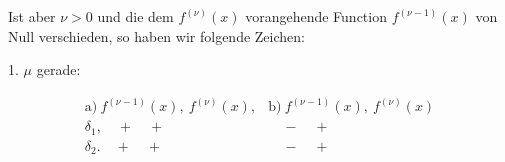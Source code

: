 Ist aber $\nu > 0$ und die dem $f^{(\nu)}(x)$ vorangehende Function $f^{(\nu-1)}(x)$ von Null verschieden, so haben wir folgende Zeichen:

1. $\mu$ gerade:

\[
\begin{array}{ll}
\text{a)}\ f^{(\nu-1)}(x),\ f^{(\nu)}(x), & \text{b)}\ f^{(\nu-1)}(x),\ f^{(\nu)}(x) \\[2pt]
\delta_1,\quad + \quad + & \quad - \quad + \\[2pt]
\delta_2.\quad + \quad + & \quad - \quad +
\end{array}
\]
